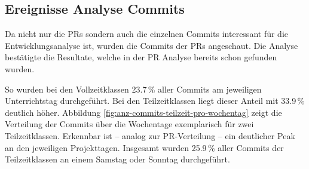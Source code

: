 \subsection{Ereignisse Analyse Commits}
Da nicht nur die PRs sondern auch die einzelnen Commits interessant für die Entwicklungsanalyse ist, wurden die Commits der PRs angeschaut. 
Die Analyse bestätigte die Resultate, welche in der PR Analyse bereits schon gefunden wurden. 

So wurden bei den Vollzeitklassen 23.7\,\% aller Commits am jeweiligen Unterrichtstag durchgeführt. Bei den Teilzeitklassen liegt dieser Anteil mit 33.9\,\% deutlich höher. Abbildung \autoref{fig:anz-commits-teilzeit-pro-wochentag} zeigt die Verteilung der Commits über die Wochentage exemplarisch für zwei Teilzeitklassen. Erkennbar ist – analog zur PR-Verteilung – ein deutlicher Peak an den jeweiligen Projekttagen. Insgesamt wurden 25.9\,\% aller Commits der Teilzeitklassen an einem Samstag oder Sonntag durchgeführt.

